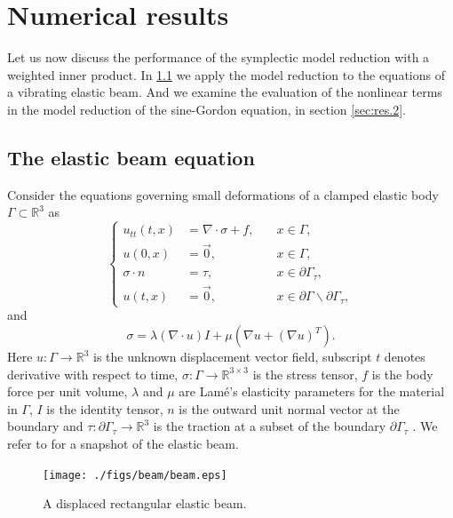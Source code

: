 \section{Numerical results} \label{sec:res}
Let us now discuss the performance of the symplectic model reduction with a weighted inner product. In \cref{sec:res.1} we apply the model reduction to the equations of a vibrating elastic beam. And we examine the evaluation of the nonlinear terms in the model reduction of the sine-Gordon equation, in section \cref{sec:res.2}.

\subsection{The elastic beam equation} \label{sec:res.1}
Consider the equations governing small deformations of a clamped elastic body $\Gamma\subset \mathbb R^{3}$ as 
\begin{equation} \label{eq:res.1}
\left\{
\begin{aligned}
	u_{tt}(t,x) &= \nabla \cdot \sigma + f, \quad & x\in \Gamma, \\
	u(0,x) &= \vec 0, & x\in \Gamma,\\
	\sigma \cdot n &= \tau, & x \in \partial \Gamma_\tau,\\
	u(t,x) &= \vec 0, & x \in\partial \Gamma \backslash \partial \Gamma_\tau,
\end{aligned}
\right.
\end{equation}
and
\begin{equation}  \label{eq:res.2}
	\sigma = \lambda (\nabla \cdot u) I + \mu(\nabla u + (\nabla u)^T).
\end{equation}
Here $u:\Gamma \to \mathbb{R}^3$ is the unknown displacement vector field, subscript $t$ denotes derivative with respect to time, $\sigma:\Gamma \to \mathbb{R}^{3\times 3}$ is the stress tensor, $f$ is the body force per unit volume, $\lambda$ and $\mu$ are Lam\'e's elasticity parameters for the material in $\Gamma$, $I$ is the identity tensor, $n$ is the outward unit normal vector at the boundary and $\tau:\partial \Gamma_\tau \to \mathbb R^3$ is the traction at a subset of the boundary $\partial \Gamma_\tau$ \cite{langtangen2017solving}. We refer to  for a snapshot of the elastic beam.
\begin{figure}[htbp] \label{fig:beam}
\texttt{[image: ./figs/beam/beam.eps]}
\caption{A displaced rectangular elastic beam.}
\end{figure}


